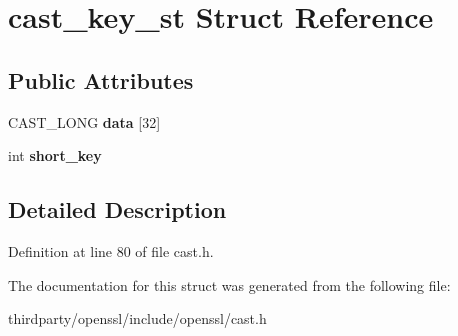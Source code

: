 \hypertarget{structcast__key__st}{}\section{cast\+\_\+key\+\_\+st Struct Reference}
\label{structcast__key__st}
\subsection*{Public Attributes}
\begin{DoxyCompactItemize}
\item 
\mbox{\label{structcast__key__st_a016e1aa6521740a3a438bc04b2c78014}} 
C\+A\+S\+T\+\_\+\+L\+O\+NG {\bfseries data} \mbox{[}32\mbox{]}
\item 
\mbox{\label{structcast__key__st_a34043464743188eea278cc583540db15}} 
int {\bfseries short\+\_\+key}
\end{DoxyCompactItemize}


\subsection{Detailed Description}


Definition at line 80 of file cast.\+h.



The documentation for this struct was generated from the following file\+:\begin{DoxyCompactItemize}
\item 
thirdparty/openssl/include/openssl/cast.\+h\end{DoxyCompactItemize}
